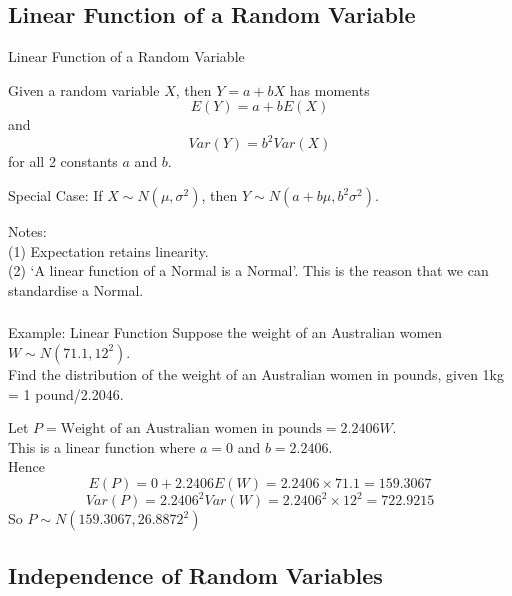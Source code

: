 \documentclass[t,xcolor=pdftex,dvipsnames,table]{beamer}\usepackage[]{graphicx}\usepackage[]{color}
\begin{document}
\subsection[Linear Function]{Linear Function of a Random Variable}
\begin{frame}{Linear Function of a Random Variable}
\begin{definition}
Given a random variable $X$, then $Y = a + b X$ has moments
\[ \boxed{ E(Y) = a + b E(X) } \]
and
\[ \boxed{ Var(Y) = b^2 Var(X) } \]
for all 2 constants $a$ and $b$.

\vspace{.5cm}
Special Case:
If $X \sim N(\mu, \sigma^2)$, then $Y \sim N(a + b \mu, b^2 \sigma^2)$. 

\end{definition}

Notes:  \\
(1) Expectation retains linearity. \\
(2) `A linear function of a Normal is a Normal'. This is the reason that we can standardise a Normal.
\end{frame}

\begin{frame}[fragile]\frametitle{}

\begin{block}{Example: Linear Function}
Suppose the weight of an Australian women $W \sim N(71.1, 12^2)$.
\href{http://www.abs.gov.au/ausstats/abs@.nsf/0/E11CED5FB86D178ACA257AA30014C059?opendocument}{} \\
Find the distribution of the weight of an Australian women in pounds, given 1kg = 1 pound/2.2046.
\end{block}

\vspace{.5cm}
Let $P = \mbox{Weight of an Australian women in pounds} = 2.2406 W$. \\

This is a linear function where $a=0$ and $b= 2.2406$. \\

Hence 
\[ E(P) = 0 + 2.2406 E(W) = 2.2406 \times 71.1 =  159.3067 \]
\[ Var(P) = 2.2406^2 Var(W) = 2.2406^2 \times 12^2 = 722.9215 \]
So $P \sim N(159.3067, 26.8872^2)$
\end{frame}




\subsection[Independence]{Independence of Random Variables}
\end{document}

